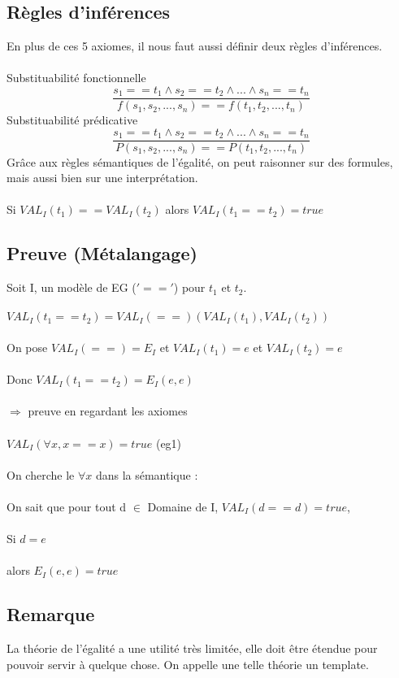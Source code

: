 \subsection{Règles d'inférences}
En plus de ces 5 axiomes, il nous faut aussi définir deux règles d'inférences.\\ \\
Substituabilité fonctionnelle 
	$$ \frac{s_{1}==t_{1} \land s_{2}==t_{2} \land ... \land s_{n}==t_{n}}{f(s_{1},s_{2},...,s_{n}) == f(t_{1},t_{2},...,t_{n})}$$ 
	Substituabilité prédicative 
	$$ \frac{s_{1}==t_{1} \land s_{2}==t_{2} \land ... \land s_{n}==t_{n}}{P(s_{1},s_{2},...,s_{n}) == P(t_{1},t_{2},...,t_{n})}$$ 
Grâce aux règles sémantiques de l'égalité, on peut raisonner sur des formules, mais aussi bien sur une interprétation. \\ \\
Si $VAL_{I}(t_{1}) ==  VAL_{I}(t_{2})$ alors $VAL_{I}(t_{1} == t_{2}) = true$
\subsection*{Preuve (Métalangage)}
Soit I, un modèle de EG ($'=='$) pour $t_{1}$ et $t_{2}$. \\ \\
$VAL_{I}(t_{1} == t_{2}) = VAL_{I}(==)(VAL_{I}(t_{1}), VAL_{I}(t_{2}))$\\ \\
On pose $VAL_{I}(==) = E_{I}$ et $VAL_{I}(t_{1}) = e$ et $VAL_{I}(t_{2}) = e$ \\ \\
Donc $VAL_{I}(t_{1} == t_{2}) =E_{I}(e,e)$ \\ \\
$\Rightarrow$ preuve en regardant les axiomes \\ \\
$ VAL_{I}(\forall x, x==x)= true$ (eg1) \\ \\
On cherche le $\forall x$ dans la sémantique : \\ \\
On sait que pour tout d $\in$ Domaine de I, $VAL_{I}(d==d)=true$, \\ \\
Si $d = e$\\ \\
alors $E_{I}(e,e)=true$
\subsection{Remarque}
La théorie de l'égalité a une utilité très limitée, elle doit être étendue pour pouvoir servir à quelque chose. On appelle une telle théorie un template.
